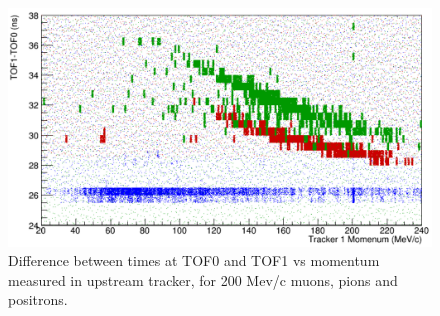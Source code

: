 \begin{figure}[h!]
\begin{center} 
\includegraphics[width=4.5in]{reconstruction/globalpid/toftrackerplot.jpg} 
\caption{Difference between times at TOF0 and TOF1 vs momentum measured in upstream tracker, for 200 Mev/c muons, pions and positrons.}
\label{toftrackerplot}
\end{center} 
\end{figure}
